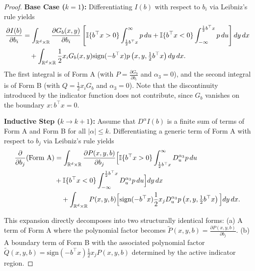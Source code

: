 \begin{proof}
\noindent\textbf{Base Case ($k=1$):} Differentiating $I(b)$ with respect to $b_i$ via Leibniz's rule yields
\begin{align*}
    \frac{\partial I(b)}{\partial b_i} &= \int_{\mathbb{R}^d \times \mathbb{R}} \frac{\partial G_b(x, y)}{\partial b_i} \left[ \mathbb{I}\{b^\top x > 0\} \int_{\frac{1}{2}b^\top x}^{\infty} p \, du + \mathbb{I}\{b^\top x < 0\} \int_{-\infty}^{\frac{1}{2}b^\top x} p \, du \right] dy \, dx \\
    &\quad + \int_{\mathbb{R}^d \times \mathbb{R}} \frac{1}{2}x_i G_b(x, y) \text{sign}(-b^\top x) p\left(x, y, \tfrac{1}{2}b^\top x\right) dy \, dx.
\end{align*}
The first integral is of Form A (with $P = \frac{\partial G_b}{\partial b_i}$ and $\alpha_3=0$), and the second integral is of Form B (with $Q = \frac{1}{2}x_i G_b$ and $\alpha_3=0$). Note that the discontinuity introduced by the indicator function does not contribute, since $G_b$ vanishes on the boundary ${x : b^\top x = 0}$.

\noindent\textbf{Inductive Step ($k \to k+1$):} Assume that $D^\alpha I(b)$ is a finite sum of terms of Form A and Form B for all $|\alpha| \le k$. Differentiating a generic term of Form A with respect to $b_j$ via Leibniz's rule yields
\begin{align*}
    \frac{\partial}{\partial b_j} (\text{Form A}) &= \int_{\mathbb{R}^d \times \mathbb{R}} \frac{\partial P(x,y,b)}{\partial b_j} \Big[ \mathbb{I}\{b^\top x > 0\} \int_{\frac{1}{2}b^\top x}^{\infty} D_u^{\alpha_3} p \, du \\
    &+ \mathbb{I}\{b^\top x < 0\} \int_{-\infty}^{\frac{1}{2}b^\top x} D_u^{\alpha_3} p \, du \Big] dy \, dx \\
    &\quad + \int_{\mathbb{R}^d \times \mathbb{R}} P(x,y,b) \Big[ \text{sign}(-b^\top x) \frac{1}{2}x_j D_u^{\alpha_3} p\left(x,y,\tfrac{1}{2}b^\top x\right)\Big] dy \, dx.
\end{align*}

This expansion directly decomposes into two structurally identical forms:
(a) A term of Form A where the polynomial factor becomes $\tilde{P}(x,y,b) = \frac{\partial P(x,y,b)}{\partial b_j}$.
(b) A boundary term of Form B with the associated polynomial factor $\tilde{Q}(x,y,b) = \text{sign}(-b^\top x) \frac{1}{2}x_j P(x,y,b)$ determined by the active indicator region.


\end{proof}
